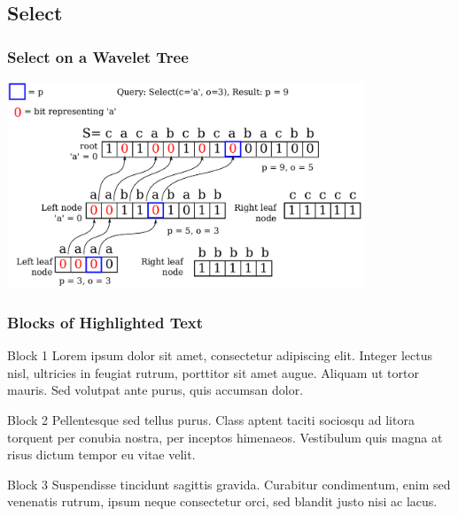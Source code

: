 \documentclass{beamer}
\begin{document}
\subsection{Select}
\begin{frame}
\frametitle{Select on a Wavelet Tree}
\begin{center}
	\includegraphics[width=0.8\textwidth]{SelectDrawing}
\end{center}
\end{frame}

\begin{frame}
\frametitle{Blocks of Highlighted Text}
\begin{block}{Block 1}
Lorem ipsum dolor sit amet, consectetur adipiscing elit. Integer lectus nisl, ultricies in feugiat rutrum, porttitor sit amet augue. Aliquam ut tortor mauris. Sed volutpat ante purus, quis accumsan dolor.
\end{block}

\begin{block}{Block 2}
Pellentesque sed tellus purus. Class aptent taciti sociosqu ad litora torquent per conubia nostra, per inceptos himenaeos. Vestibulum quis magna at risus dictum tempor eu vitae velit.
\end{block}

\begin{block}{Block 3}
Suspendisse tincidunt sagittis gravida. Curabitur condimentum, enim sed venenatis rutrum, ipsum neque consectetur orci, sed blandit justo nisi ac lacus.
\end{block}
\end{frame}

\end{document}
